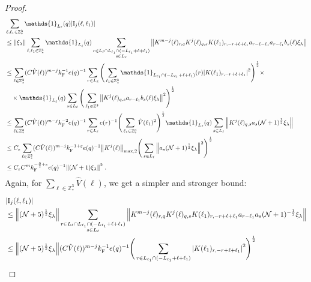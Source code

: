 \documentclass[12pt,a4paper]{article}
\numberwithin{equation}{section}
\newcommand{\1}{\mathbb{I}}
\newcommand{\F}{\mathrm{F}}
\newcommand{\I}{\mathrm{I}}
\newcommand{\Z}{\mathbb{Z}}
\newcommand{\NN}{\mathcal{N}}
\newcommand{\half}{\frac{1}{2}}
\theoremstyle{plain}
\theoremstyle{definition}
\theoremstyle{remark}
\theoremstyle{plain}
\theoremstyle{definition}
\theoremstyle{remark}
\begin{document}
\begin{proof}
\begin{align}
	&\sum_{\ell,\ell_1 \in \Z^3_*} \mathds{1}_{L_\ell}(q) |\I_j(\ell, \ell_1)| \nonumber\\
	&\leq \norm{ \xi_\lambda} \sum_{\ell,\ell_1 \in \Z^3_*} \mathds{1}_{L_\ell}(q)
		\sum\limits_{\substack{r\in L_{\ell} \cap L_{\ell_1}  \cap (-L_{\ell_1} + \ell + \ell_1)\\s\in L_{\ell}}}
		\norm{K^{m-j}(\ell)_{r,q} K^j(\ell)_{q,s} K(\ell_1)_{r,-r+\ell+\ell_1} a_{r-\ell-\ell_1} a_{r-\ell_1} b_{s}(\ell) \xi_\lambda }\nonumber\\
	&\leq \sum_{\ell \in \Z^3_*}
		(C \hat{V}(\ell))^{m-j} k_{\F}^{-1} e(q)^{-1}
		\sum\limits_{r \in L_\ell} \Bigg(\sum_{\ell_1 \in \Z^3_*} \mathds{1}_{L_{\ell_1} \cap (-L_{\ell_1}+\ell+\ell_1)}(r) \abs{ K(\ell_1)_{r,-r+\ell+\ell_1} }^2\Bigg)^\half \times\nonumber\\ 
	&\quad \times \mathds{1}_{L_\ell}(q) \sum\limits_{s\in L_{\ell}} \Bigg( \sum_{\ell_1 \in \Z^3} \norm{K^{j}(\ell)_{q,s} a_{r-\ell_1} b_{s}(\ell) \xi_\lambda }^2 \Bigg)^\half \nonumber\\
	&\leq \sum_{\ell \in \Z^3_*}
		(C \hat{V}(\ell))^{m-j} k_{\F}^{-2} e(q)^{-1}
		\sum\limits_{r \in L_\ell} e(r)^{-1} \Bigg(\sum_{\ell_1 \in \Z^3_*} \hat{V}(\ell_1)^2 \Bigg)^\half
		\mathds{1}_{L_\ell}(q) \sum\limits_{s\in L_{\ell}} \norm{K^{j}(\ell)_{q,s} a_s (\NN+1)^{\half} \xi_\lambda } \nonumber\\
	&\leq C_\varepsilon \sum_{\ell \in \Z^3_*}
		(C \hat{V}(\ell))^{m-j} k_{\F}^{-1+\varepsilon} e(q)^{-1}
		\norm{K^j(\ell)}_{\max,2}
		\Bigg( \sum\limits_{s\in L_{\ell}} \norm{a_s (\NN+1)^{\half} \xi_\lambda }^2 \Bigg)^{\half} \nonumber\\
	&\leq C_\varepsilon C^m k_{\F}^{-\frac 32 + \varepsilon} e(q)^{-1} \norm{(\NN+1) \xi_\lambda }^2 \;. \label{eq:estEQ1122_Coulomb}
\end{align}
Again, for $ \sum_{\ell \in \Z^3_*} \hat{V}(\ell) $, we get a simpler and stronger bound:
\begin{align}
	&|\I_j(\ell, \ell_1)| \nonumber\\
	&\leq \norm{ (\NN+5)^{\half} \xi_\lambda}
		\sum_{\substack{r\in L_{\ell} \cap L_{\ell_1} \cap (-L_{\ell_1} + \ell + \ell_1)\\s\in L_{\ell}}}
		\norm{K^{m-j}(\ell)_{r,q} K^j(\ell)_{q,s} K(\ell_1)_{r,-r+\ell+\ell_1} a_{r-\ell_1} a_s (\NN+1)^{-\half} \xi_\lambda }\nonumber\\
	&\leq \norm{ (\NN+5)^{\half} \xi_\lambda} 
		(C \hat{V}(\ell))^{m-j} k_{\F}^{-1} e(q)^{-1}
		\Bigg(\sum_{r\in L_{\ell_1} \cap (-L_{\ell_1} + \ell + \ell_1)}\abs{ K(\ell_1)_{r,-r+\ell+\ell_1} }^2\Bigg)^\half \nonumber\\

\end{align}
\end{proof}
\end{document}
